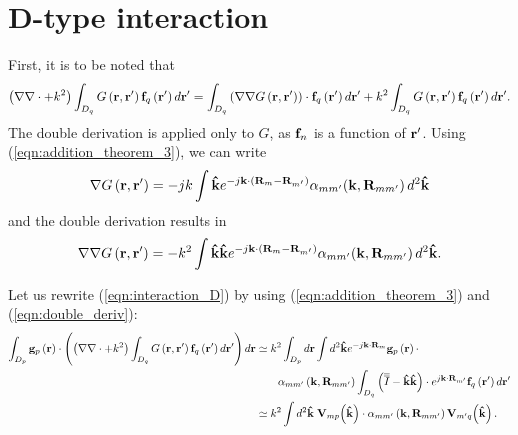 \section{D-type interaction}
%
\par
First, it is to be noted that 
\begin{equation}
\left(\nabla \nabla \cdot + k^2\right) \int_{D_q} G\left(\mathbf{r}, \mathbf{r}'\right) \mathbf{f}_q\left(\mathbf{r}'\right) d\mathbf{r}' = \int_{D_q} \left(\nabla \nabla G\left(\mathbf{r}, \mathbf{r}'\right) \right) \cdot \mathbf{f}_q\left(\mathbf{r}'\right) d\mathbf{r}' + k^2 \int_{D_q} G\left(\mathbf{r}, \mathbf{r}'\right) \mathbf{f}_q\left(\mathbf{r}'\right) d\mathbf{r}'.
\end{equation}
The double derivation is applied only to $G$, as $\mathbf{f}_n$ is a function of $\mathbf{r}'$. Using (\ref{eqn:addition_theorem_3}), we can write 
\begin{equation}
\nabla G\left(\mathbf{r}, \mathbf{r}'\right) = -jk \int \mathbf{\hat{k}} e^{-j\mathbf{k} \cdot \left( \mathbf{R}_{m} - \mathbf{R}_{m'} \right)}  \alpha_{mm'} \! \left(\mathbf{k}, \mathbf{R}_{mm'} \right) d^2\mathbf{\hat{k}}
\end{equation}
and the double derivation results in
\begin{equation}\label{eqn:double_deriv}
\nabla \nabla G\left(\mathbf{r}, \mathbf{r}'\right) = -k^2  \int \mathbf{\hat{k}}\mathbf{\hat{k}} e^{-j\mathbf{k} \cdot \left( \mathbf{R}_{m} - \mathbf{R}_{m'} \right)}  \alpha_{mm'} \! \left(\mathbf{k}, \mathbf{R}_{mm'} \right) d^2\mathbf{\hat{k}}.
\end{equation}
%
\par
Let us rewrite (\ref{eqn:interaction_D}) by using (\ref{eqn:addition_theorem_3}) and (\ref{eqn:double_deriv}):
\begin{equation}
\begin{split}
\int_{D_p} \mathbf{g}_p\left(\mathbf{r}\right) \cdot \left(\left(\nabla \nabla \cdot + k^2\right) \int_{D_q} G\left(\mathbf{r}, \mathbf{r}'\right) \mathbf{f}_q\left(\mathbf{r}'\right) d\mathbf{r}' \right) d\mathbf{r} &\simeq k^2 \int_{D_p}d \mathbf{r} \int d^2\mathbf{\hat{k}} e^{-j\mathbf{k} \cdot \mathbf{R}_{m}}\mathbf{g}_p\left(\mathbf{r}\right) \cdot \\ & \qquad \alpha_{mm'}\left(\mathbf{k}, \mathbf{R}_{mm'}\right) \int_{D_q} \left( \overline{\overline{I}}-\mathbf{\hat{k}}\mathbf{\hat{k}} \right) \cdot e^{j\mathbf{k} \cdot \mathbf{R}_{m'}} \mathbf{f}_q\left(\mathbf{r}'\right) d \mathbf{r}' \\
&\simeq k^2 \int d^2\mathbf{\hat{k}} \; \mathbf{V}_{mp} \! \left(\mathbf{\hat{k}}\right) \cdot \alpha_{mm'}\left(\mathbf{k}, \mathbf{R}_{mm'} \right) \mathbf{V}_{m'q} \! \left(\mathbf{\hat{k}}\right).
\end{split}
\end{equation}
